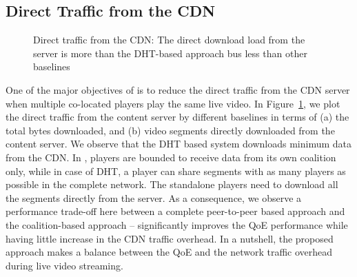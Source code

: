\subsection{Direct Traffic from the CDN} 
\begin{figure}[!ht]
	\captionsetup[subfigure]{width=0.49\linewidth}
	\begin{center}
	\end{center}
	\caption{\label{fig:chap06:cdnuploaded}Direct traffic from the CDN: The direct download load from the server is more than the DHT-based approach bus less than other baselines}
\end{figure}
One of the major objectives of {\our} is to reduce the direct traffic from the CDN server when multiple co-located players play the same live video. In Figure~\ref{fig:chap06:cdnuploaded}, we plot the direct traffic from the content server by different baselines in terms of (a) the total bytes downloaded, and (b) video segments directly downloaded from the content server. We observe that the DHT based system downloads minimum data from the CDN. In \our, players are bounded to receive data from its own coalition only, while in case of DHT, a player can share segments with as many players as possible in the complete network. The standalone players need to download all the segments directly from the server. As a consequence, we observe a performance trade-off here between a complete peer-to-peer based approach and the coalition-based approach -- {\our} significantly improves the QoE performance while having little increase in the CDN traffic overhead. In a nutshell, the proposed approach makes a balance between the QoE and the network traffic overhead during live video streaming.

